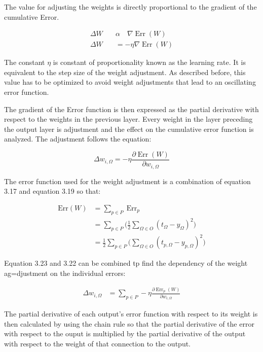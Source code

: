 The value for adjusting the weights is directly proportional to the gradient of the cumulative Error.

\begin{align}
\Delta W \quad & \alpha \quad  \nabla \operatorname {Err} (W) \nonumber\\
\Delta W  &=  - \eta \nabla \operatorname { Err } ( W )
\end{align}
 
The constant $\eta$ is constant of proportionality known as the learning rate. It is equivalent to the step size of the weight adjustment. As described before, this value has to be optimized to avoid weight adjustments that lead to an oscillating error function. 

The gradient of the Error function is then expressed as the partial derivative with respect to the weights in the previous layer.
Every weight in the layer preceding the output layer is adjustment and the effect on the cumulative error function is analyzed. The adjustment follows the equation:

 \begin{equation}
 \Delta w _ { i , \Omega } = - \eta \frac { \partial \operatorname { Err } ( W ) } { \partial w _ { i , \Omega } }
  \end{equation}

The error function used for the weight adjustment is a combination of equation 3.17 and equation 3.19 so that:

\begin{align}
\text {Err}(W) &= \sum _ { p \in P } \operatorname { Err } _ { p }  \\
&= \sum_{p \in P} \big( \frac { 1 } { 2 } \sum _ { \Omega \in O } \left( t _ { \Omega } - y _ { \Omega } \right) ^ { 2 }\big)  \\
&=\frac{1}{2} \sum_{p \in P} \Big(  \sum _ { \Omega \in O } \left( t _ {p, \Omega } - y _ {p, \Omega } \right) ^ { 2 }\Big)
\end{align}

Equation 3.23 and 3.22 can be combined tp find the dependency of the weight ag=djustment on the individual errors:

\begin{align} 
	\Delta w _ { i , \Omega }  & = \sum _ { p \in P } - \eta \frac { \partial \operatorname { Err } _ { p } ( W ) } { \partial w _ { i , \Omega } } 
\end{align}

The partial derivative of each output's error function with respect to its weight is then calculated by using the chain rule so that the partial derivative of the error with respect to the ouput is multiplied by the partial derivative of the output with respect to the weight of that connection to the output.

